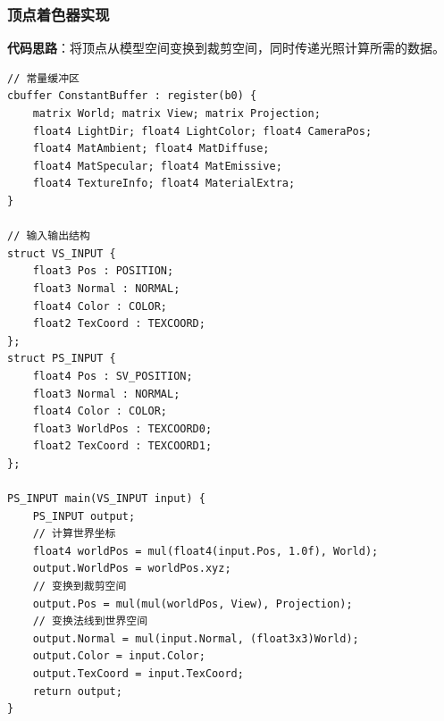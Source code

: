 \documentclass[12pt,a4paper]{article}
\begin{document}
\begin{tcolorbox}
\subsubsection{顶点着色器实现}

\textbf{代码思路}：将顶点从模型空间变换到裁剪空间，同时传递光照计算所需的数据。

\begin{lstlisting}[caption={HLSL顶点着色器}]
// 常量缓冲区
cbuffer ConstantBuffer : register(b0) {
    matrix World; matrix View; matrix Projection;
    float4 LightDir; float4 LightColor; float4 CameraPos;
    float4 MatAmbient; float4 MatDiffuse; 
    float4 MatSpecular; float4 MatEmissive;
    float4 TextureInfo; float4 MaterialExtra;
}

// 输入输出结构
struct VS_INPUT { 
    float3 Pos : POSITION; 
    float3 Normal : NORMAL; 
    float4 Color : COLOR; 
    float2 TexCoord : TEXCOORD; 
};
struct PS_INPUT { 
    float4 Pos : SV_POSITION; 
    float3 Normal : NORMAL; 
    float4 Color : COLOR; 
    float3 WorldPos : TEXCOORD0; 
    float2 TexCoord : TEXCOORD1; 
};

PS_INPUT main(VS_INPUT input) {
    PS_INPUT output;
    // 计算世界坐标
    float4 worldPos = mul(float4(input.Pos, 1.0f), World);
    output.WorldPos = worldPos.xyz;
    // 变换到裁剪空间
    output.Pos = mul(mul(worldPos, View), Projection);
    // 变换法线到世界空间
    output.Normal = mul(input.Normal, (float3x3)World);
    output.Color = input.Color;
    output.TexCoord = input.TexCoord;
    return output;
}
\end{lstlisting}
\end{tcolorbox}
\end{document}
